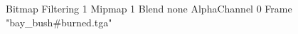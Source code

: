 {Bitmap
	{Filtering 1}
	{Mipmap 1}
	{Blend none}
	{AlphaChannel 0}
	{Frame "bay_bush#burned.tga"}
}

